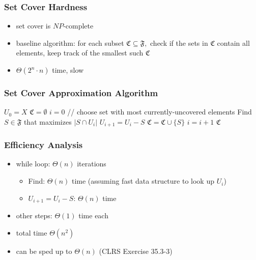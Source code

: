 \documentclass{beamer}
\begin{document}
\begin{frame} \frametitle{Set Cover Hardness}
  \begin{itemize}
    \item set cover is $NP$-complete
    \item baseline algorithm: for each subset $\mathfrak{C} \subseteq \mathfrak{F},$ check if the sets in $\mathfrak{C}$ contain all elements, keep track of the smallest such $\mathfrak{C}$
    \item $\Theta(2^n \cdot n)$ time, slow
  \end{itemize}
\end{frame}

\begin{frame} \frametitle{Set Cover Approximation Algorithm}
  \begin{algorithmic}[1]
      \State $U_0 = X$ 
      \State $\mathfrak{C} = \emptyset$
      \State $i=0$
        \State // choose set with most currently-uncovered elements
        \State Find $S \in \mathfrak{F}$ that maximizes $|S \cap U_i|$  
        \State $U_{i+1} = U_i - S$
        \State $\mathfrak{C} = \mathfrak{C} \cup \{S\}$
        \State $i = i + 1$
      \EndWhile
      \State \Return $\mathfrak{C}$
    \EndFunction
  \end{algorithmic}
\end{frame}

\begin{frame} \frametitle{Efficiency Analysis}
  \begin{itemize}
    \item while loop: $\Theta(n)$ iterations
    \begin{itemize}
      \item Find: $\Theta(n)$ time (assuming fast data structure to look up $U_i$)
      \item $U_{i+1} = U_i - S$: $\Theta(n)$ time
    \end{itemize}
    \item other steps: $\Theta(1)$ time each
    \item total time $\Theta(n^2)$ 
    \item can be sped up to $\Theta(n)$ (CLRS Exercise 35.3-3)
  \end{itemize}
\end{frame}
\end{document}
